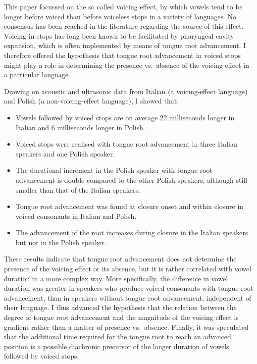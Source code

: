 \documentclass[authoryear, twocolumn]{elsarticle}
\providecommand{\tightlist}{%
  \setlength{\itemsep}{0pt}\setlength{\parskip}{0pt}}
\begin{document}
This paper focussed on the so called voicing effect, by which vowels
tend to be longer before voiced than before voiceless stops in a variety
of languages. No consensus has been reached in the literature regarding
the source of this effect. Voicing in stops has long been known to be
facilitated by pharyngeal cavity expansion, which is often implemented
by means of tongue root advancement. I therefore offered the hypothesis
that tongue root advancement in voiced stops might play a role in
determining the presence vs.~absence of the voicing effect in a
particular language.

Drawing on acoustic and ultrasonic data from Italian (a voicing-effect
language) and Polish (a non-voicing-effect language), I showed that:

\begin{itemize}
\tightlist
\item
  Vowels followed by voiced stops are on average 22 milliseconds longer
  in Italian and 6 milliseconds longer in Polish.
\item
  Voiced stops were realised with tongue root advancement in three
  Italian speakers and one Polish speaker.
\item
  The durational increment in the Polish speaker with tongue root
  advancement is double compared to the other Polish speakers, although
  still smaller than that of the Italian speakers.
\item
  Tongue root advancement was found at closure onset and within closure
  in voiced consonants in Italian and Polish.
\item
  The advancement of the root increases during closure in the Italian
  speakers but not in the Polish speaker.
\end{itemize}

These results indicate that tongue root advancement does not determine
the presence of the voicing effect or its absence, but it is rather
correlated with vowel duration in a more complex way. More specifically,
the difference in vowel duration was greater in speakers who produce
voiced consonants with tongue root advancement, than in speakers without
tongue root advancement, independent of their language. I thus advanced
the hypothesis that the relation between the degree of tongue root
advancement and the magnitude of the voicing effect is gradient rather
than a matter of presence vs.~absence. Finally, it was speculated that
the additional time required for the tongue root to reach an advanced
position is a possible diachronic precursor of the longer duration of
vowels followed by voiced stops.


\end{document}
